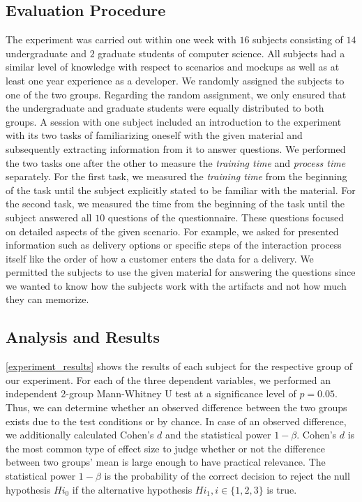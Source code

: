 \documentclass[conference]{IEEEtran}
\begin{document}
\subsection{Evaluation Procedure}
The experiment was carried out within one week with $16$ subjects consisting of 
$14$ undergraduate and $2$ graduate students of computer science. 
All subjects had a similar level of knowledge with respect to scenarios and 
mockups as well as at least one year experience as a developer. We randomly 
assigned the subjects to one of the two groups. Regarding 
the random assignment, we only ensured that the undergraduate and graduate 
students were equally distributed to both groups. A session with one subject 
included an introduction to the experiment with its two tasks of familiarizing 
oneself with the given material and subsequently extracting information from it 
to answer questions. We performed the two tasks one after the other to measure 
the \textit{training time} and \textit{process time} separately. For the first 
task, we measured the \textit{training time} from the beginning of the task 
until the subject explicitly stated to be familiar with the material. For the 
second task, we measured the time from the beginning of the task until the 
subject answered all $10$ questions of the questionnaire. These questions 
focused on detailed aspects of the given scenario. For example, we asked for 
presented information such as delivery options or specific steps of the 
interaction process itself like the order of how a customer enters the data for 
a delivery. We permitted the subjects to use the given material for answering 
the questions since we wanted to know how the subjects work with the artifacts 
and not how much they can memorize.

\subsection{Analysis and Results}
\tablename{ \ref{experiment_results}} shows the results of each subject for the 
respective group of our experiment. For each of the three dependent variables, 
we performed an independent 2-group Mann-Whitney U test at a significance level 
of $p = 0.05$. Thus, we can determine whether an observed difference between 
the two groups exists due to the test conditions or by chance. In case of an 
observed difference, we additionally calculated Cohen's $d$ and the statistical 
power $1 - \beta$. Cohen's $d$ is the most common type of effect size to judge 
whether or not the difference between two groups' mean is large enough to have 
practical relevance. The statistical power $1 - \beta$ is the probability of 
the correct decision to reject the null hypothesis $Hi_{0}$ if the alternative 
hypothesis $Hi_{1}, i \in \{1,2,3\}$ is true.
\end{document}
